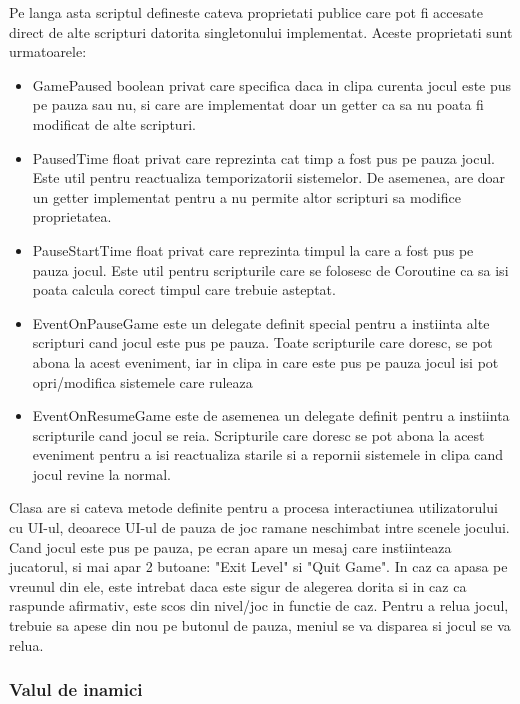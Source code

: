 \documentclass[12pt, a4paper]{article}
\begin{document}
	Pe langa asta scriptul defineste cateva proprietati publice care pot fi accesate direct de alte scripturi datorita singletonului implementat. Aceste proprietati sunt urmatoarele:
	
	\begin{itemize}
		\item GamePaused boolean privat care specifica daca in clipa curenta jocul este pus pe pauza sau nu, si care are implementat doar un getter ca sa nu poata fi modificat de alte scripturi.
		\item PausedTime float privat care reprezinta cat timp a fost pus pe pauza jocul. Este util pentru reactualiza temporizatorii sistemelor. De asemenea, are doar un getter implementat pentru a nu permite altor scripturi sa modifice proprietatea.
		\item PauseStartTime float privat care reprezinta timpul la care a fost pus pe pauza jocul. Este util pentru scripturile care se folosesc de Coroutine ca sa isi poata calcula corect timpul care trebuie asteptat.
		\item EventOnPauseGame este un delegate definit special pentru a instiinta alte scripturi cand jocul este pus pe pauza. Toate scripturile care doresc, se pot abona la acest eveniment, iar in clipa in care este pus pe pauza jocul isi pot opri/modifica sistemele care ruleaza
		\item EventOnResumeGame este de asemenea un delegate definit pentru a instiinta scripturile cand jocul se reia. Scripturile care doresc se pot abona la acest eveniment pentru a isi reactualiza starile si a repornii sistemele in clipa cand jocul revine la normal.
	\end{itemize}

	Clasa are si cateva metode definite pentru a procesa interactiunea utilizatorului cu UI-ul, deoarece UI-ul de pauza de joc ramane neschimbat intre scenele jocului. Cand jocul este pus pe pauza, pe ecran apare un mesaj care instiinteaza jucatorul, si mai apar 2 butoane: "Exit Level" si "Quit Game". In caz ca apasa pe vreunul din ele, este intrebat daca este sigur de alegerea dorita si in caz ca raspunde afirmativ, este scos din nivel/joc in functie de caz. Pentru a relua jocul, trebuie sa apese din nou pe butonul de pauza, meniul se va disparea si jocul se va relua.
	
	
	
	
	
	\subsubsection{Valul de inamici}
	\label{section: enemyWave}
	
\end{document}
